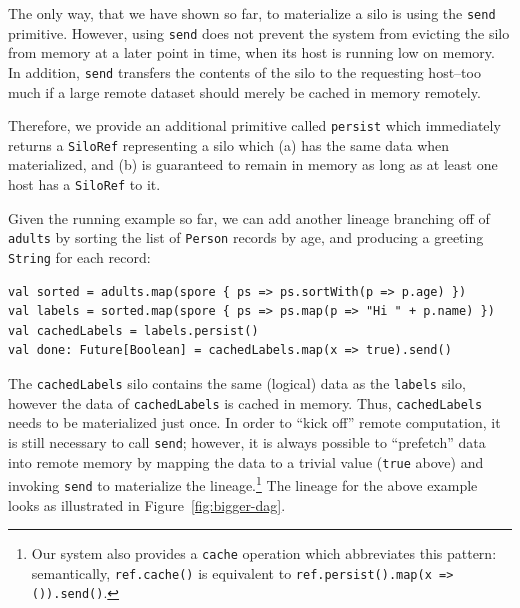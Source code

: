 \documentclass{jfp1}
\begin{document}
The only way, that we have shown so far, to materialize a silo is
using the \verb|send| primitive. However, using \verb|send| does not
prevent the system from evicting the silo from memory at a later point
in time, \eg when its host is running low on memory. In addition,
\verb|send| transfers the contents of the silo to the requesting
host--too much if a large remote dataset should merely be cached in
memory remotely.

Therefore, we provide an additional primitive called \verb|persist|
which immediately returns a \verb|SiloRef| representing a silo which
(a) has the same data when materialized, and (b) is guaranteed to
remain in memory as long as at least one host has a \verb|SiloRef| to
it.

Given the running example so far, we can add another lineage branching
off of \verb|adults| by sorting the list of \verb|Person| records by
age, and producing a greeting \verb|String| for each record:

\begin{lstlisting}
val sorted = adults.map(spore { ps => ps.sortWith(p => p.age) })
val labels = sorted.map(spore { ps => ps.map(p => "Hi " + p.name) })
val cachedLabels = labels.persist()
val done: Future[Boolean] = cachedLabels.map(x => true).send()
\end{lstlisting}
\noindent
The \verb|cachedLabels| silo contains the same (logical) data as the
\verb|labels| silo, however the data of \verb|cachedLabels| is cached
in memory. Thus, \verb|cachedLabels| needs to be materialized just
once. In order to ``kick off'' remote computation, it is still
necessary to call \verb|send|; however, it is always possible to
``prefetch'' data into remote memory by mapping the data to a trivial
value (\verb|true| above) and invoking \verb|send| to materialize the
lineage.\footnote{Our system also provides a \texttt{cache} operation
  which abbreviates this pattern: semantically, \texttt{ref.cache()}
  is equivalent to \texttt{ref.persist().map(x => ()).send()}.} The
lineage for the above example looks as illustrated in
Figure~\ref{fig:bigger-dag}.


\end{document}
